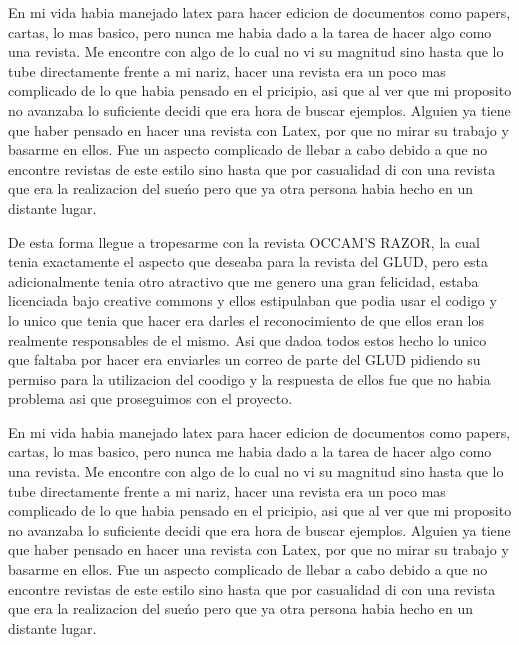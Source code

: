 \begin{multicols}{2}
En mi vida habia manejado latex para hacer edicion de documentos como papers, cartas, lo mas basico, 
pero nunca me habia dado a la tarea de hacer algo como una revista. Me encontre con algo de lo cual 
no vi su magnitud sino hasta que lo tube directamente frente a mi nariz, hacer una revista era un poco 
mas complicado de lo que habia pensado en el pricipio, asi que al ver que mi proposito no avanzaba lo 
suficiente decidi que era hora de buscar ejemplos. Alguien ya tiene que haber pensado en hacer una 
revista con Latex, por que no mirar su trabajo y basarme en ellos. Fue un aspecto complicado de llebar 
a cabo debido a que no encontre revistas de este estilo sino hasta que por casualidad di con una revista 
que era la realizacion del sueńo pero que ya otra persona habia hecho en un distante lugar. 

De esta forma llegue a tropesarme con la revista OCCAM'S RAZOR, la cual tenia exactamente el 
aspecto que deseaba para la revista del GLUD, pero esta adicionalmente tenia otro atractivo que me 
genero una gran felicidad, estaba licenciada bajo creative commons y ellos estipulaban que podia usar 
el codigo y lo unico que tenia que hacer era darles el reconocimiento de que ellos eran los realmente 
responsables de el mismo. Asi que dadoa todos estos hecho lo unico que faltaba por hacer era enviarles 
un correo de parte del GLUD pidiendo su permiso para la utilizacion del coodigo y la respuesta de ellos 
fue que no habia problema asi que proseguimos con el proyecto.


%
%

En mi vida habia manejado latex para hacer edicion de documentos como papers, cartas, lo mas basico, 
pero nunca me habia dado a la tarea de hacer algo como una revista. Me encontre con algo de lo cual 
no vi su magnitud sino hasta que lo tube directamente frente a mi nariz, hacer una revista era un poco 
mas complicado de lo que habia pensado en el pricipio, asi que al ver que mi proposito no avanzaba lo 
suficiente decidi que era hora de buscar ejemplos. Alguien ya tiene que haber pensado en hacer una 
revista con Latex, por que no mirar su trabajo y basarme en ellos. Fue un aspecto complicado de llebar 
a cabo debido a que no encontre revistas de este estilo sino hasta que por casualidad di con una revista 
que era la realizacion del sueńo pero que ya otra persona habia hecho en un distante lugar. 



\end{multicols}
